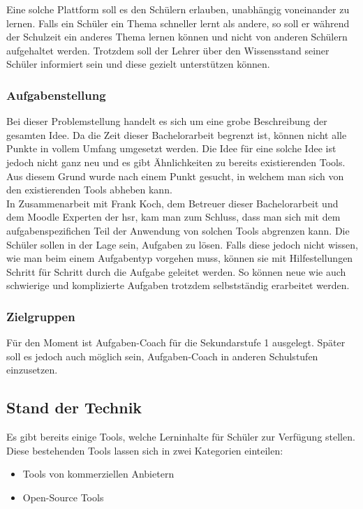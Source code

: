 Eine solche Plattform soll es den Schülern erlauben, unabhängig voneinander zu lernen. Falls ein Schüler ein Thema schneller lernt als andere, so soll er während der Schulzeit ein anderes Thema lernen können und nicht von anderen Schülern aufgehaltet werden. Trotzdem soll der Lehrer über den Wissensstand seiner Schüler informiert sein und diese gezielt unterstützen können.

\subsubsection{Aufgabenstellung}
Bei dieser Problemstellung handelt es sich um eine grobe Beschreibung der gesamten Idee. Da die Zeit dieser Bachelorarbeit begrenzt ist, können nicht alle Punkte in vollem Umfang umgesetzt werden. Die Idee für eine solche Idee ist jedoch nicht ganz neu und es gibt Ähnlichkeiten zu bereits existierenden Tools. Aus diesem Grund wurde nach einem Punkt gesucht, in welchem man sich von den existierenden Tools abheben kann. \\

In Zusammenarbeit mit Frank Koch, dem Betreuer dieser Bachelorarbeit und dem Moodle Experten der \gls{hsr}, kam man zum Schluss, dass man sich mit dem aufgabenspezifichen Teil der Anwendung von solchen Tools abgrenzen kann. Die Schüler sollen in der Lage sein, Aufgaben zu lösen. Falls diese jedoch nicht wissen, wie man beim einem Aufgabentyp vorgehen muss, können sie mit Hilfestellungen Schritt für Schritt durch die Aufgabe geleitet werden. So können neue wie auch schwierige und komplizierte Aufgaben trotzdem selbstständig erarbeitet werden. \\

\subsubsection{Zielgruppen}
Für den Moment ist Aufgaben-Coach für die Sekundarstufe 1 ausgelegt. Später soll es jedoch auch möglich sein, Aufgaben-Coach in anderen Schulstufen einzusetzen.

\subsection{Stand der Technik}
Es gibt bereits einige Tools, welche Lerninhalte für Schüler zur Verfügung stellen. Diese bestehenden Tools lassen sich in zwei Kategorien einteilen:
\begin{itemize}
	\item Tools von kommerziellen Anbietern
	\item Open-Source Tools
\end{itemize}

